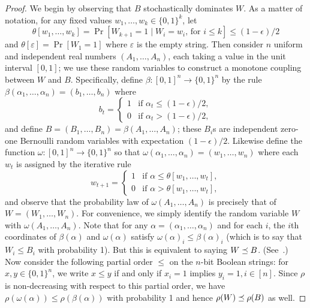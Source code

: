 \begin{proof}
  We begin by observing that $B$ stochastically dominates $W$. As a
  matter of notation, for any fixed values
  $w_1, \ldots, w_k \in \{0,1\}^k$, let
  \[
    \theta[w_1, \ldots, w_k] = \Pr[ W_{k+1} = 1 \mid
    \text{$W_i = w_i$, for $i \leq k$}] \leq (1 - \epsilon)/2
  \]
  and $\theta[\varepsilon] = \Pr[W_1 = 1]$ 
  where $\varepsilon$ is the empty string. Then consider $n$ uniform and
  independent real numbers $(A_1, \ldots, A_n)$, each taking a value
  in the unit interval $[0,1]$; we use these random variables to construct a monotone
  coupling between $W$ and $B$. 
  Specifically, define $\beta: [0,1]^n \rightarrow \{0,1\}^n$
  by the rule $\beta(\alpha_1, \ldots, \alpha_n) = (b_1, \ldots, b_n)$
  where
  \[
    b_t = \begin{cases} 1 & \text{if $\alpha_t \leq (1-\epsilon)/2$},\\
      0 & \text{if $\alpha_t > (1 - \epsilon)/2$},
    \end{cases}
  \]
  and define
  $B = (B_1, \ldots, B_n) = \beta(A_1, \ldots, A_n)$; these
  $B_i$s are independent zero-one Bernoulli random variables with expectation
  $(1-\epsilon)/2$. Likewise define the function
  $\omega:[0,1]^n \rightarrow \{0,1\}^n$ so that
  $\omega(\alpha_1, \ldots, \alpha_n) = (w_1, \ldots, w_n)$
  where each $w_t$ is assigned by the iterative rule
  \[
    w_{t+1} = \begin{cases} 1 & \text{if $\alpha \leq \theta[w_1, \ldots, w_t]$},\\
      0 & \text{if $\alpha > \theta[w_1, \ldots, w_t]$},
    \end{cases}
  \]
  and observe that the probability law of
  $\omega(A_1, \ldots, A_n)$ is precisely that of
  $W = (W_1, \ldots, W_n)$. For convenience, we simply identify the
  random variable $W$ with $\omega(A_1, \ldots, A_n)$. Note
  that for any $\alpha = (\alpha_1, \ldots, \alpha_n)$ and for each
  $i$, the $i$th coordinates of $\beta(\alpha)$ and $\omega(\alpha)$ satisfy
  $\omega(\alpha)_i \leq \beta(\alpha)_i$ 
  (which is to say that $W_i \leq B_i$ with probability 1). 
  But this is equivalent to saying $W \preceq B$. 
  (See~\cite[Lemma 22.5]{LevinPeres}.) 
  Now consider the following partial order $\leq$ on the $n$-bit Boolean strings: 
  for $x,y \in \{0,1\}^n$, 
  we write $x \leq y$ if and only if $x_i = 1$ implies $y_i = 1, i \in [n]$.
  Since $\rho$ is non-decreasing with respect to this partial order, 
  we have  
  $\rho(\omega(\alpha)) \leq \rho(\beta(\alpha))$ with probability 1 and
  hence $\rho(W) \preceq \rho(B)$ as well. 
  


\end{proof}
